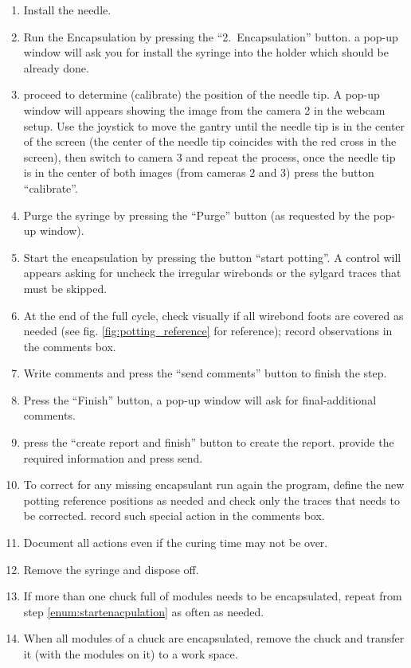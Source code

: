 \documentclass[12pt]{unlsilabsop}
\begin{document}
\begin{enumerate}
    \item Install the needle.
    \item Run the Encapsulation by pressing the ``2.~Encapsulation'' button. a pop-up window will ask you for install the syringe into the holder which should be already done.
    \item proceed to determine (calibrate) the position of the needle tip. A pop-up window will appears showing the image from the camera 2 in the webcam setup. Use the joystick to move the gantry until the needle tip is in the center of the screen (the center of the needle tip coincides with the red cross in the screen), then switch to camera 3 and repeat the process, once the needle tip is in the center of both images (from cameras 2 and 3) press the button ``calibrate''.
    \item Purge the syringe by pressing the ``Purge'' button (as requested by the pop-up window).
    \item Start the encapsulation by pressing the button ``start potting''. A control will appears asking for uncheck the irregular wirebonds or the sylgard traces that must be skipped.     
    \item At the end of the full cycle, check visually if all wirebond foots are covered as needed (see fig. \ref{fig:potting_reference} for reference); record observations in the comments box.
    \item Write comments and press the ``send comments'' button to finish the step. 
    \item Press the ``Finish'' button, a pop-up window will ask for final-additional comments.
    \item press the ``create report and finish'' button to create the report. provide the required information and press send.
    \item To correct for any missing encapsulant run again the program, define the new potting reference positions as needed and check only the traces that needs to be corrected. record such special action in the comments box.
    \item Document all actions even if the curing time may not be over.
    \item Remove the syringe and dispose off.   
    \item If more than one chuck full of modules needs to be encapsulated, repeat from step \ref{enum:startenacpulation} as often as needed.
    \item When all modules of a chuck are encapsulated, remove the chuck and transfer it (with the modules on it) to a work space.

\end{enumerate}
\end{document}
